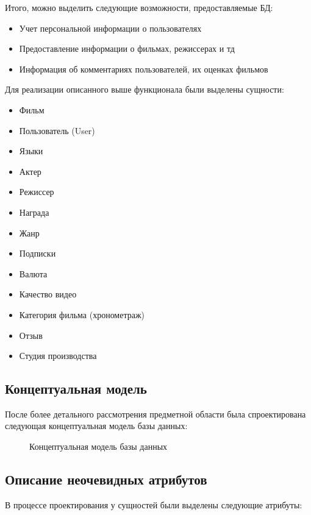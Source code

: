 Итого, можно выделить следующие возможности, предоставляемые БД:
\begin{itemize}
\item Учет персональной информации о пользователях
\item Предоставление информации о фильмах, режиссерах и тд
\item Информация об комментариях пользователей, их оценках фильмов
\end{itemize}
Для реализации описанного выше функционала были выделены сущности:
\begin{itemize}
    \item Фильм
    \item Пользователь (User)
    \item Языки
    \item Актер
 \item Режиссер
    \item Награда
      \item Жанр
    \item Подписки
    \item Валюта
    \item Качество видео
    \item Категория фильма (хронометраж)
    \item Отзыв
    \item Студия производства
\end{itemize}

\subsection{Концептуальная модель}
После более детального рассмотрения предметной области была спроектирована следующая концептуальная модель базы данных:
\begin{figure} [h]
    \caption{Концептуальная модель базы данных}
\end{figure}

\subsection{Описание неочевидных атрибутов}
В процессе проектирования у сущностей были выделены следующие атрибуты:


